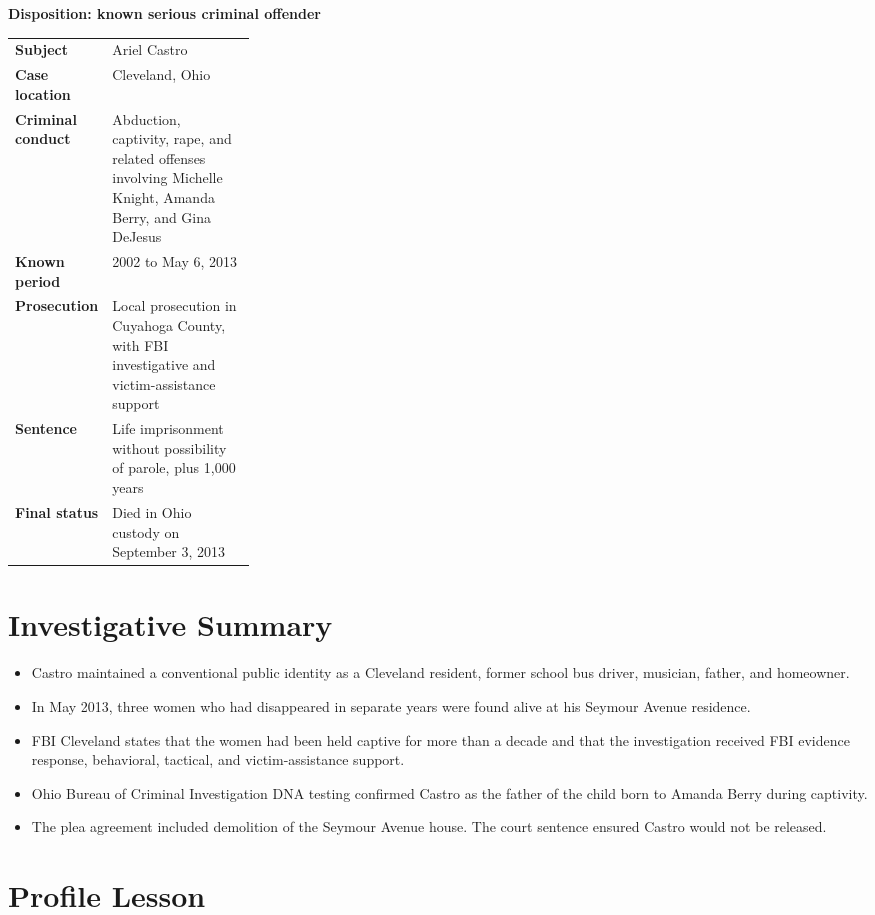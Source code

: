 \clearpage


{\Large\bfseries Disposition: known serious criminal offender}

\begin{tabularx}{\linewidth}{>{\bfseries}p{0.28\linewidth}X}
Subject & Ariel Castro\\
Case location & Cleveland, Ohio\\
Criminal conduct & Abduction, captivity, rape, and related offenses involving Michelle Knight, Amanda Berry, and Gina DeJesus\\
Known period & 2002 to May 6, 2013\\
Prosecution & Local prosecution in Cuyahoga County, with FBI investigative and victim-assistance support\\
Sentence & Life imprisonment without possibility of parole, plus 1,000 years\\
Final status & Died in Ohio custody on September 3, 2013\\
\end{tabularx}

\section*{Investigative Summary}

\begin{itemize}
  \item Castro maintained a conventional public identity as a Cleveland resident, former school bus driver, musician, father, and homeowner.
  \item In May 2013, three women who had disappeared in separate years were found alive at his Seymour Avenue residence.
  \item FBI Cleveland states that the women had been held captive for more than a decade and that the investigation received FBI evidence response, behavioral, tactical, and victim-assistance support.
  \item Ohio Bureau of Criminal Investigation DNA testing confirmed Castro as the father of the child born to Amanda Berry during captivity.
  \item The plea agreement included demolition of the Seymour Avenue house. The court sentence ensured Castro would not be released.
\end{itemize}

\section*{Profile Lesson}

